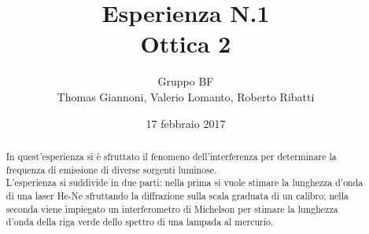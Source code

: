 \documentclass[11pt,a4paper]{article}
\author{Gruppo BF \\ \smallskip Thomas Giannoni, Valerio Lomanto, Roberto Ribatti}
\title{Esperienza N.1 \\Ottica 2}
\date{17 febbraio 2017}
\begin{document}
\maketitle

\begin{abstract}
In quest'esperienza si è sfruttato il fenomeno dell'interferenza per determinare la frequenza di emissione di diverse sorgenti luminose.
\\L'esperienza si suddivide in due parti: nella prima si vuole stimare
la lunghezza d'onda di una laser He-Ne sfruttando la diffrazione sulla scala
graduata di un calibro; nella seconda viene impiegato un interferometro di
Michelson per stimare la lunghezza d'onda della riga verde dello
spettro di una lampada al mercurio.
\end{abstract}









\end{document}
